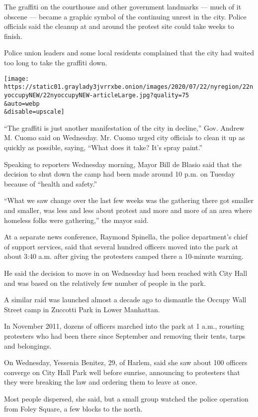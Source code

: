 The graffiti on the courthouse and other government landmarks --- much
of it obscene --- became a graphic symbol of the continuing unrest in
the city. Police officials said the cleanup at and around the protest
site could take weeks to finish.

Police union leaders and some local residents complained that the city
had waited too long to take the graffiti down.

\texttt{[image: https://static01.graylady3jvrrxbe.onion/images/2020/07/22/nyregion/22nyoccupyNEW/22nyoccupyNEW-articleLarge.jpg?quality=75\\\&auto=webp\\\&disable=upscale]}

``The graffiti is just another manifestation of the city in decline,''
Gov. Andrew M. Cuomo said on Wednesday. Mr. Cuomo urged city officials
to clean it up as quickly as possible, saying, ``What does it take? It's
spray paint.''

Speaking to reporters Wednesday morning, Mayor Bill de Blasio said that
the decision to shut down the camp had been made around 10 p.m. on
Tuesday because of ``health and safety.''

``What we saw change over the last few weeks was the gathering there got
smaller and smaller, was less and less about protest and more and more
of an area where homeless folks were gathering,'' the mayor said.

At a separate news conference, Raymond Spinella, the police department's
chief of support services, said that several hundred officers moved into
the park at about 3:40 a.m. after giving the protesters camped there a
10-minute warning.

He said the decision to move in on Wednesday had been reached with City
Hall and was based on the relatively few number of people in the park.

A similar raid was launched almost a decade ago to dismantle the Occupy
Wall Street camp in Zuccotti Park in Lower Manhattan.

In November 2011, dozens of officers marched into the park at 1 a.m.,
rousting protesters who had been there since September and removing
their tents, tarps and belongings.

On Wednesday, Yessenia Benitez, 29, of Harlem, said she saw about 100
officers converge on City Hall Park well before sunrise, announcing to
protesters that they were breaking the law and ordering them to leave at
once.

Most people dispersed, she said, but a small group watched the police
operation from Foley Square, a few blocks to the north.

